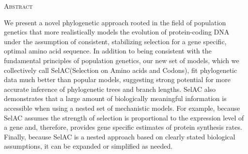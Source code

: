 \documentclass[12pt,letterpaper]{article}
\renewcommand{\section}[1]{%
\bigskip
\begin{center}
\begin{Large}
\normalfont\scshape #1
\medskip
\end{Large}
\end{center}}
\newcommand{\selac}{SelAC\xspace}
\begin{document}


\newpage

\section{Abstract}
We present a novel phylogenetic approach rooted in the field of population genetics that more realistically models the evolution of protein-coding DNA under the assumption of consistent, stabilizing selection for a gene specific, optimal amino acid sequence.
In addition to being consistent with the fundamental principles of population genetics, our new set of models, which we collectively call \selac (Selection on Amino acids and Codons), fit phylogenetic data much better than popular models, suggesting strong potential for more accurate inference of phylogenetic trees and branch lengths.
\selac also demonstrates that a large amount of biologically meaningful information is accessible when using a nested set of mechanistic models.
For example, because \selac assumes the strength of selection is proportional to the expression level of a gene and, therefore, provides gene specific estimates of protein synthesis rates.
Finally, because SelAC is a nested approach based on clearly stated biological assumptions, it can be expanded or simplified as needed.

\newpage
\end{document}
